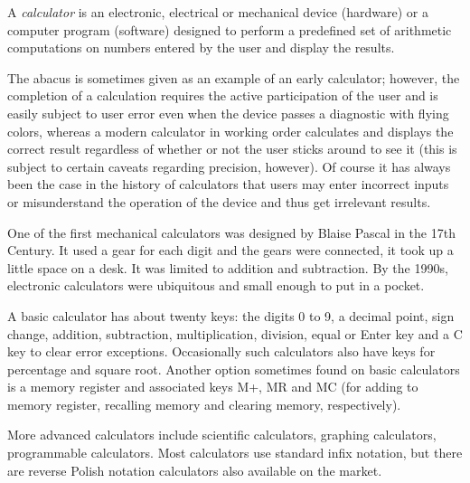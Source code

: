 \documentclass[12pt]{article}
\begin{document}
A {\em calculator} is an electronic, electrical or mechanical device (hardware) or a computer program (software) designed to perform a predefined set of arithmetic computations on numbers entered by the user and display the results.

The abacus is sometimes given as an example of an early calculator; however, the completion of a calculation requires the active participation of the user and is easily subject to user error even when the device passes a diagnostic with flying colors, whereas a modern calculator in working order calculates and displays the correct result regardless of whether or not the user sticks around to see it (this is subject to certain caveats regarding precision, however). Of course it has always been the case in the history of calculators that users may enter incorrect inputs or misunderstand the operation of the device and thus get irrelevant results.

One of the first mechanical calculators was designed by Blaise Pascal in the 17th Century. It used a gear for each digit and the gears were connected, it took up a little space on a desk. It was limited to addition and subtraction. By the 1990s, electronic calculators were ubiquitous and small enough to put in a pocket.

A basic calculator has about twenty keys: the digits 0 to 9, a decimal point, sign change, addition, subtraction, multiplication, division, equal or Enter key and a C key to clear error exceptions. Occasionally such calculators also have keys for percentage and square root. Another option sometimes found on basic calculators is a memory register and associated keys M+, MR and MC (for adding to memory register, recalling memory and clearing memory, respectively).

More advanced calculators include scientific calculators, graphing calculators, programmable calculators. Most calculators use standard infix notation, but there are reverse Polish notation calculators also available on the market.
\end{document}
